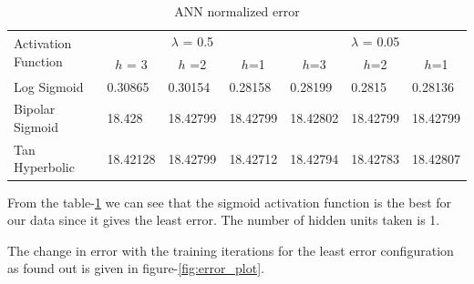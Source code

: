 \documentclass[a4paper,12bp]{report}
\begin{document}
\begin{table}[ht]
\centering
\caption{ANN normalized error}
\label{tab:error}

\vspace{15pt}
\begin{tabular}{|l|l|l|l|l|l|l|}
\hline
\multirow{2}{*}{Activation Function} & \multicolumn{3}{c|}{$\lambda$ = 0.5}                                                      & \multicolumn{3}{c|}{$\lambda$ = 0.05}                                                  \\ \cline{2-7} 
                  & \multicolumn{1}{c|}{$h$ = 3} & \multicolumn{1}{c|}{$h$ =2} & \multicolumn{1}{c|}{$h$=1} & \multicolumn{1}{c|}{$h$=3} & \multicolumn{1}{c|}{$h$=2} & \multicolumn{1}{c|}{$h$=1} \\ \hline
Log Sigmoid       & 0.30865                    & 0.30154                   & 0.28158                  & 0.28199                  & 0.2815                   & 0.28136                  \\ \hline
Bipolar Sigmoid   & 18.428                     & 18.42799                  & 18.42799                 & 18.42802                 & 18.42799                 & 18.42799                 \\ \hline
Tan Hyperbolic    & 18.42128                   & 18.42799                  & 18.42712                 & 18.42794                 & 18.42783                 & 18.42807                 \\ \hline
\end{tabular}
\end{table}

From the table-\ref{tab:error} we can see that the sigmoid activation function is the best for our data since it gives the least error. The number of hidden units taken is 1. 

The change in error with the training iterations for the least error configuration as found out is given in figure-\ref{fig:error_plot}.
\end{document}
